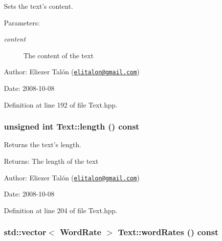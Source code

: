 Sets the text's content. 

\begin{Desc}
\item[Parameters:]
\begin{description}
\item[{\em content}]The content of the text\end{description}
\end{Desc}
\begin{Desc}
\item[Author:]Eliezer Talón (\href{mailto:elitalon@gmail.com}{\tt elitalon@gmail.com}) \end{Desc}
\begin{Desc}
\item[Date:]2008-10-08 \end{Desc}


Definition at line 192 of file Text.hpp.\hypertarget{class_text_8d76db538f8617fb8880ba3e4ff3e6a5}{
\subsubsection[length]{\setlength{\rightskip}{0pt plus 5cm}unsigned int Text::length () const}}
\label{class_text_8d76db538f8617fb8880ba3e4ff3e6a5}


Returns the text's length. 

\begin{Desc}
\item[Returns:]The length of the text\end{Desc}
\begin{Desc}
\item[Author:]Eliezer Talón (\href{mailto:elitalon@gmail.com}{\tt elitalon@gmail.com}) \end{Desc}
\begin{Desc}
\item[Date:]2008-10-08 \end{Desc}


Definition at line 204 of file Text.hpp.\hypertarget{class_text_1387d9767b65f80355f1bdede26a0f7b}{
\subsubsection[wordRates]{\setlength{\rightskip}{0pt plus 5cm}std::vector$<$ {\bf WordRate} $>$ Text::wordRates () const}}
\label{class_text_1387d9767b65f80355f1bdede26a0f7b}


